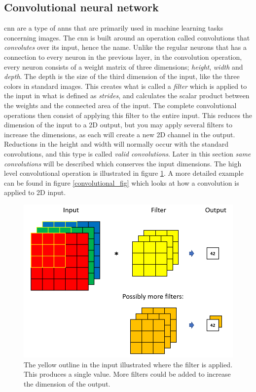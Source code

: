 \subsection{Convolutional neural network}
    \gls{cnn} are a type of \gls{ann}s that are primarily used in machine learning tasks concerning images\cite{o2015introduction_convolutions}. The \gls{cnn} is built around an operation called convolutions that \textit{convolutes} over its input, hence the name. Unlike the regular neurons that has a connection to every neuron in the previous layer, in the convolution operation, every neuron consists of a weight matrix of three dimensions; \textit{height}, \textit{width} and \textit{depth}. The depth is the size of the third dimension of the input, like the three colors in standard images. This creates what is called a \textit{filter} which is applied to the input in what is defined as \textit{strides}, and calculates the scalar product between the weights and the connected area of the input. The complete convolutional operations then consist of applying this filter to the entire input. This reduces the dimension of the input to a 2D output, but you may apply several filters to increase the dimensions, as each will create a new 2D channel in the output. Reductions in the height and width will normally occur with the standard convolutions, and this type is called \textit{valid convolutions}. Later in this section \textit{same convolutions} will be described which conserves the input dimensions. The high level convolutional operation is illustrated in figure \ref{convolutional_filters_fig}. A more detailed example can be found in figure \ref{convolutional_fig} which looks at how a convolution is applied to 2D input. 
    
    \begin{figure}[H]
        \centering
        \includegraphics[scale=0.5]{figures/convolution.png}
        \caption{The yellow outline in the input illustrated where the filter is applied. This produces a single value. More filters could be added to increase the dimension of the output.}
      	\medskip 
        \label{convolutional_filters_fig}
    \end{figure}
    

